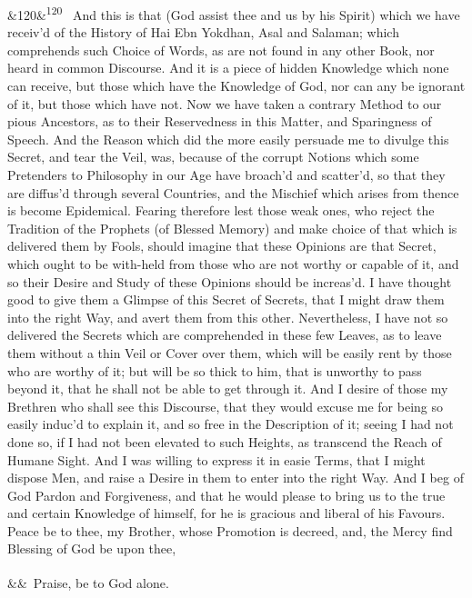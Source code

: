 \documentclass[12pt]{article}
\newcommand{\para}[1][]{\par\noindent\ifx&#1&\else\textsuperscript{\footnotesize #1}~\fi}
\begin{document}
\para[120] And this is that (God assist thee and us by his Spirit) which we have receiv'd of the History of Hai Ebn Yokdhan, Asal and Salaman; which comprehends such Choice of Words, as are not found in any other Book, nor heard in common Discourse. And it is a piece of hidden Knowledge which none can receive, but those which have the Knowledge of God, nor can any be ignorant of it, but those which have not. Now we have taken a contrary Method to our pious Ancestors, as to their Reservedness in this Matter, and Sparingness of Speech. And the Reason which did the more easily persuade me to divulge this Secret, and tear the Veil, was, because of the corrupt Notions which some Pretenders to Philosophy in our Age have broach'd and scatter'd, so that they are diffus'd through several Countries, and the Mischief which arises from thence is become Epidemical. Fearing therefore lest those weak ones, who reject the Tradition of the Prophets (of Blessed Memory) and make choice of that which is delivered them by Fools, should imagine that these Opinions are that Secret, which ought to be with-held from those who are not worthy or capable of it, and so their Desire and Study of these Opinions should be increas'd. I have thought good to give them a Glimpse of this Secret of Secrets, that I might draw them into the right Way, and avert them from this other. Nevertheless, I have not so delivered the Secrets which are comprehended in these few Leaves, as to leave them without a thin Veil or Cover over them, which will be easily rent by those who are worthy of it; but will be so thick to him, that is unworthy to pass beyond it, that he shall not be able to get through it. And I desire of those my Brethren who shall see this Discourse, that they would excuse me for being so easily induc'd to explain it, and so free in the Description of it; seeing I had not done so, if I had not been elevated to such Heights, as transcend the Reach of Humane Sight. And I was willing to express it in easie Terms, that I might dispose Men, and raise a Desire in them to enter into the right Way. And I beg of God Pardon and Forgiveness, and that he would please to bring us to the true and certain Knowledge of himself, for he is gracious and liberal of his Favours. Peace be to thee, my Brother, whose Promotion is decreed, and, the Mercy find Blessing of God be upon thee,

\para Praise, be to God alone.
\end{document}

